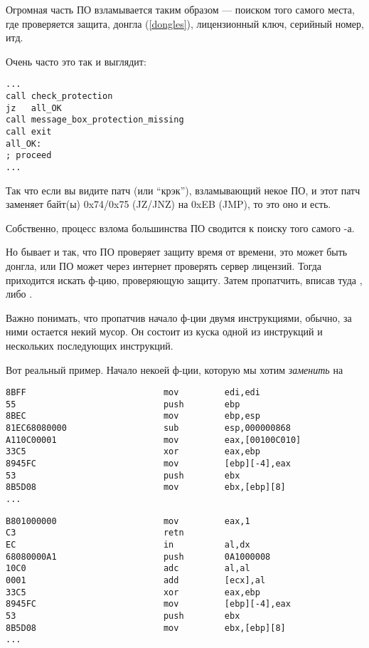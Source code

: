 \label{\SoftwareCracking}

Огромная часть ПО взламывается таким образом --- поиском того самого места, где проверяется защита, донгла (\ref{dongles}),
лицензионный ключ, серийный номер, итд.

Очень часто это так и выглядит:

\begin{lstlisting}[style=customasmx86]
...
call check_protection
jz   all_OK
call message_box_protection_missing
call exit
all_OK:
; proceed
...
\end{lstlisting}

Так что если вы видите патч (или ``крэк''), взламывающий некое ПО,
и этот патч заменяет байт(ы) 0x74/0x75 (JZ/JNZ) на 0xEB (JMP), то это оно и есть.

Собственно, процесс взлома большинства ПО сводится к поиску того самого -а.

\myhrule{}

Но бывает и так, что ПО проверяет защиту время от времени, это может быть донгла,
или ПО может через интернет проверять сервер лицензий.
Тогда приходится искать ф-цию, проверяющую защиту.
Затем пропатчить, вписав туда , либо .

Важно понимать, что пропатчив начало ф-ции двумя инструкциями, обычно, за ними остается некий мусор.
Он состоит из куска одной из инструкций и нескольких последующих инструкций.

Вот реальный пример.
Начало некоей ф-ции, которую мы хотим \emph{заменить} на 

\begin{lstlisting}[style=customasmx86,caption=Было]
8BFF                           mov         edi,edi
55                             push        ebp
8BEC                           mov         ebp,esp
81EC68080000                   sub         esp,000000868
A110C00001                     mov         eax,[00100C010]
33C5                           xor         eax,ebp
8945FC                         mov         [ebp][-4],eax
53                             push        ebx
8B5D08                         mov         ebx,[ebp][8]
...
\end{lstlisting}

\begin{lstlisting}[style=customasmx86,caption=Стало]
B801000000                     mov         eax,1
C3                             retn
EC                             in          al,dx
68080000A1                     push        0A1000008
10C0                           adc         al,al
0001                           add         [ecx],al
33C5                           xor         eax,ebp
8945FC                         mov         [ebp][-4],eax
53                             push        ebx
8B5D08                         mov         ebx,[ebp][8]
...
\end{lstlisting}

